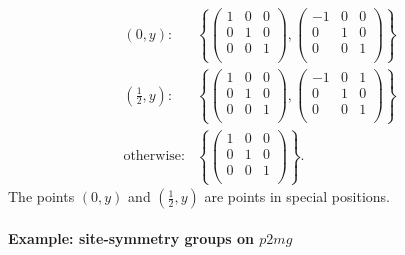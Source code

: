 \begin{align*}
  \left(0, y\right):
    &\left\{
      \left( \begin{array}{cc|c}
        1 & 0 & 0 \\
        0 & 1 & 0 \\
        \hline
        0 & 0 & 1 \\
      \end{array} \right),
      \left( \begin{array}{cc|c}
        -1 & 0 & 0 \\
        0 & 1 & 0 \\
        \hline
        0 & 0 & 1 \\
      \end{array} \right)
    \right\} \\
  \left(\frac{1}{2}, y\right):
    &\left\{
      \left( \begin{array}{cc|c}
        1 & 0 & 0 \\
        0 & 1 & 0 \\
        \hline
        0 & 0 & 1 \\
      \end{array} \right),
      \left( \begin{array}{cc|c}
        -1 & 0 & 1 \\
        0 & 1 & 0 \\
        \hline
        0 & 0 & 1 \\
      \end{array} \right)
    \right\} \\
  \mbox{otherwise}:
      &\left\{
      \left( \begin{array}{cc|c}
        1 & 0 & 0 \\
        0 & 1 & 0 \\
        \hline
        0 & 0 & 1 \\
      \end{array} \right)
      \right\}.
\end{align*}
The points $(0, y)$ and $\left( \frac{1}{2}, y \right)$ are points in special positions.

\paragraph{Example: site-symmetry groups on $p2mg$}

